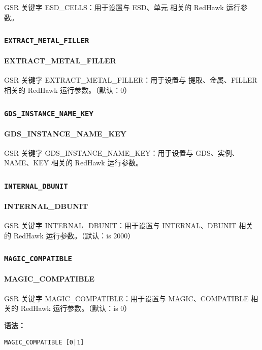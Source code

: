 \begin{noteBox}
GSR 关键字 ESD\_CELLS：用于设置与 ESD、单元 相关的 RedHawk 运行参数。
\end{noteBox}

\subsubsection{\texttt{EXTRACT_METAL_FILLER}}
\paragraph*{EXTRACT_METAL_FILLER}

GSR 关键字 EXTRACT_METAL_FILLER：用于设置与 提取、金属、FILLER 相关的 RedHawk 运行参数。（默认：0）

\subsubsection{\texttt{GDS_INSTANCE_NAME_KEY}}
\paragraph*{GDS_INSTANCE_NAME_KEY}

GSR 关键字 GDS_INSTANCE_NAME_KEY：用于设置与 GDS、实例、NAME、KEY 相关的 RedHawk 运行参数。

\subsubsection{\texttt{INTERNAL_DBUNIT}}
\paragraph*{INTERNAL_DBUNIT}

GSR 关键字 INTERNAL_DBUNIT：用于设置与 INTERNAL、DBUNIT 相关的 RedHawk 运行参数。（默认：is 2000）

\subsubsection{\texttt{MAGIC_COMPATIBLE}}
\paragraph*{MAGIC_COMPATIBLE}

GSR 关键字 MAGIC_COMPATIBLE：用于设置与 MAGIC、COMPATIBLE 相关的 RedHawk 运行参数。（默认：is 0）

\textbf{语法：}
\begin{lstlisting}
MAGIC_COMPATIBLE [0|1]
\end{lstlisting}


